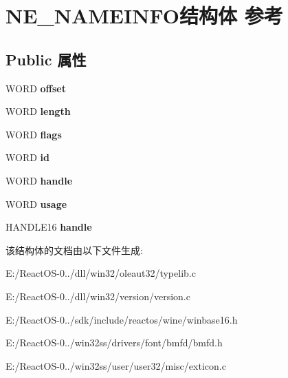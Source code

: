 \hypertarget{struct_n_e___n_a_m_e_i_n_f_o}{}\section{N\+E\+\_\+\+N\+A\+M\+E\+I\+N\+F\+O结构体 参考}
\label{struct_n_e___n_a_m_e_i_n_f_o}
\subsection*{Public 属性}
\begin{DoxyCompactItemize}
\item 
\mbox{\label{struct_n_e___n_a_m_e_i_n_f_o_a36a87a92fc1eb605a0b928b4e60be557}} 
W\+O\+RD {\bfseries offset}
\item 
\mbox{\label{struct_n_e___n_a_m_e_i_n_f_o_a40240bb25f4d0975667642eb750725df}} 
W\+O\+RD {\bfseries length}
\item 
\mbox{\label{struct_n_e___n_a_m_e_i_n_f_o_a8ce2b60e6d5b2160a44bf5e021439200}} 
W\+O\+RD {\bfseries flags}
\item 
\mbox{\label{struct_n_e___n_a_m_e_i_n_f_o_a7cbdffadcf3e934e0b4d79829fbb0d94}} 
W\+O\+RD {\bfseries id}
\item 
\mbox{\label{struct_n_e___n_a_m_e_i_n_f_o_a2bb212f5e1b1f9734b4e7afae1acaeb6}} 
W\+O\+RD {\bfseries handle}
\item 
\mbox{\label{struct_n_e___n_a_m_e_i_n_f_o_a9d3dcbbb8623c93bd00f48ba968fbeaf}} 
W\+O\+RD {\bfseries usage}
\item 
\mbox{\label{struct_n_e___n_a_m_e_i_n_f_o_a0ef73400a2d758895713f80e0a0cb9b0}} 
H\+A\+N\+D\+L\+E16 {\bfseries handle}
\end{DoxyCompactItemize}


该结构体的文档由以下文件生成\+:\begin{DoxyCompactItemize}
\item 
E\+:/\+React\+O\+S-\/0../dll/win32/oleaut32/typelib.\+c\item 
E\+:/\+React\+O\+S-\/0../dll/win32/version/version.\+c\item 
E\+:/\+React\+O\+S-\/0../sdk/include/reactos/wine/winbase16.\+h\item 
E\+:/\+React\+O\+S-\/0../win32ss/drivers/font/bmfd/bmfd.\+h\item 
E\+:/\+React\+O\+S-\/0../win32ss/user/user32/misc/exticon.\+c\end{DoxyCompactItemize}
